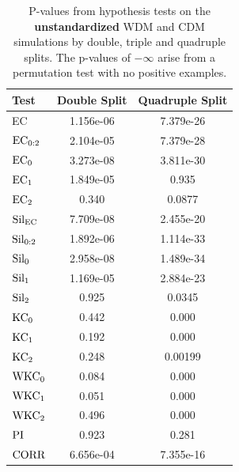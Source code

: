 \documentclass[12pt]{article}
\begin{document}
\begin{table}[htp!]
    \begin{center}
        \begin{tabular}{ l | c | c }
            Test & Double Split & Quadruple Split \\
            \hline
            EC & 1.156e-06 & 7.379e-26 \\
            $\textup{EC}_{0:2}$ & 2.104e-05 & 7.379e-28 \\
            $\textup{EC}_{0}$ & 3.273e-08 & 3.811e-30 \\
            $\textup{EC}_{1}$ &  1.849e-05 & 0.935 \\
            $\textup{EC}_{2}$ & 0.340 & 0.0877 \\
            \hline
            $\textup{Sil}_{\textup{EC}}$ & 7.709e-08 & 2.455e-20 \\ 
            $\textup{Sil}_{0:2}$ & 1.892e-06 & 1.114e-33 \\
            $\textup{Sil}_{0}$ & 2.958e-08 & 1.489e-34 \\
            $\textup{Sil}_{1}$ & 1.169e-05 & 2.884e-23 \\
            $\textup{Sil}_{2}$ & 0.925 & 0.0345 \\
            \hline
            $\textup{KC}_{0}$ & 0.442 & 0.000 \\
            $\textup{KC}_{1}$ & 0.192 & 0.000 \\
            $\textup{KC}_{2}$ & 0.248 & 0.00199 \\
            \hline
            $\textup{WKC}_{0}$ & 0.084 & 0.000 \\
            $\textup{WKC}_{1}$ & 0.051 & 0.000 \\
            $\textup{WKC}_{2}$ & 0.496 & 0.000 \\
            $\textup{PI}$ & 0.923 & 0.281 \\
            \hline
            $\textup{CORR}$ & 6.656e-04 & 7.355e-16 \\
        \end{tabular}
    \end{center}
\caption{P-values from hypothesis tests on the \textbf{unstandardized} WDM and CDM simulations by double, triple and quadruple splits. The p-values of $-\infty$ arise from a permutation test with no positive examples.}
\label{table:unnormhypoCDMWDMresults}
\end{table}
\end{document}
